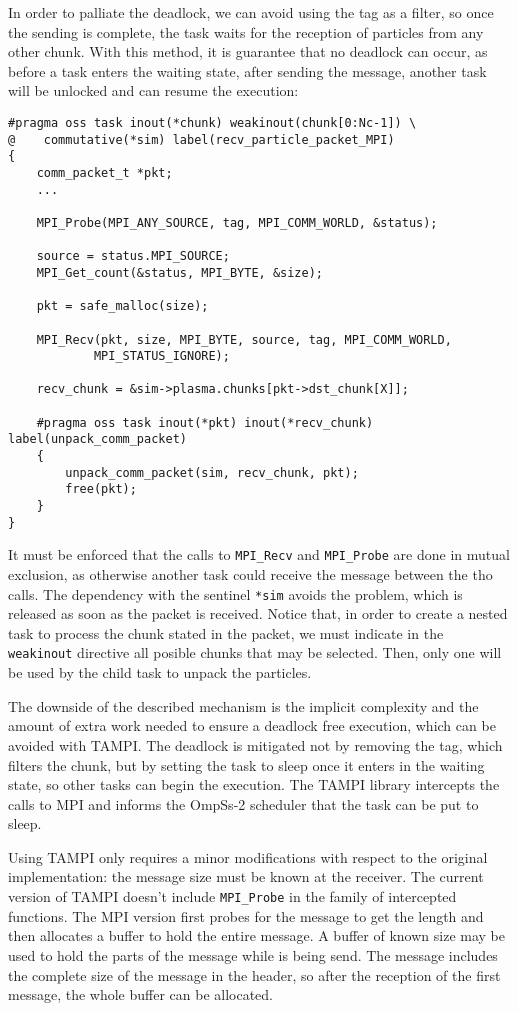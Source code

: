 In order to palliate the deadlock, we can avoid using the tag as a filter, so 
once the sending is complete, the task waits for the reception of particles from 
any other chunk.  With this method, it is guarantee that no deadlock can occur, 
as before a task enters the waiting state, after sending the message, another 
task will be unlocked and can resume the execution:
%
\begin{lstlisting}[caption={Reception of particles with MPI}]
#pragma oss task inout(*chunk) weakinout(chunk[0:Nc-1]) \
@    commutative(*sim) label(recv_particle_packet_MPI)
{
	comm_packet_t *pkt;
	...

	MPI_Probe(MPI_ANY_SOURCE, tag, MPI_COMM_WORLD, &status);

	source = status.MPI_SOURCE;
	MPI_Get_count(&status, MPI_BYTE, &size);

	pkt = safe_malloc(size);

	MPI_Recv(pkt, size, MPI_BYTE, source, tag, MPI_COMM_WORLD,
			MPI_STATUS_IGNORE);

	recv_chunk = &sim->plasma.chunks[pkt->dst_chunk[X]];

	#pragma oss task inout(*pkt) inout(*recv_chunk) label(unpack_comm_packet)
	{
		unpack_comm_packet(sim, recv_chunk, pkt);
		free(pkt);
	}
}
\end{lstlisting}
%
It must be enforced that the calls to \texttt{MPI\_Recv} and \texttt{MPI\_Probe} 
are done in mutual exclusion, as otherwise another task could receive the 
message between the tho calls. The dependency with the sentinel \texttt{*sim} 
avoids the problem, which is released as soon as the packet is received. Notice 
that, in order to create a nested task to process the chunk stated in the 
packet, we must indicate in the \texttt{weakinout} directive all posible chunks 
that may be selected. Then, only one will be used by the child task to unpack 
the particles.

The downside of the described mechanism is the implicit complexity and the 
amount of extra work needed to ensure a deadlock free execution, which can be 
avoided with TAMPI. The deadlock is mitigated not by removing the tag, which 
filters the chunk, but by setting the task to sleep once it enters in the 
waiting state, so other tasks can begin the execution. The TAMPI library 
intercepts the calls to MPI and informs the OmpSs-2 scheduler that the task can 
be put to sleep.

Using TAMPI only requires a minor modifications with respect to the original 
implementation: the message size must be known at the receiver. The current 
version of TAMPI doesn't include \texttt{MPI\_Probe} in the family of 
intercepted functions. The MPI version first probes for the message to get the 
length and then allocates a buffer to hold the entire message. A buffer of known 
size may be used to hold the parts of the message while is being send. The 
message includes the complete size of the message in the header, so after the 
reception of the first message, the whole buffer can be allocated.

